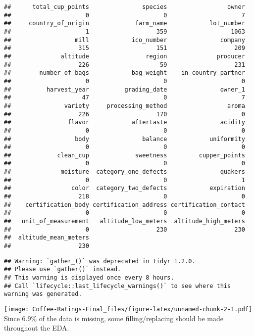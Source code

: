 \documentclass[
]{article}
\begin{document}
\begin{verbatim}
##      total_cup_points               species                 owner 
##                     0                     0                     7 
##     country_of_origin             farm_name            lot_number 
##                     1                   359                  1063 
##                  mill            ico_number               company 
##                   315                   151                   209 
##              altitude                region              producer 
##                   226                    59                   231 
##        number_of_bags            bag_weight    in_country_partner 
##                     0                     0                     0 
##          harvest_year          grading_date               owner_1 
##                    47                     0                     7 
##               variety     processing_method                 aroma 
##                   226                   170                     0 
##                flavor            aftertaste               acidity 
##                     0                     0                     0 
##                  body               balance            uniformity 
##                     0                     0                     0 
##             clean_cup             sweetness         cupper_points 
##                     0                     0                     0 
##              moisture  category_one_defects               quakers 
##                     0                     0                     1 
##                 color  category_two_defects            expiration 
##                   218                     0                     0 
##    certification_body certification_address certification_contact 
##                     0                     0                     0 
##   unit_of_measurement   altitude_low_meters  altitude_high_meters 
##                     0                   230                   230 
##  altitude_mean_meters 
##                   230
\end{verbatim}

\begin{verbatim}
## Warning: `gather_()` was deprecated in tidyr 1.2.0.
## Please use `gather()` instead.
## This warning is displayed once every 8 hours.
## Call `lifecycle::last_lifecycle_warnings()` to see where this warning was generated.
\end{verbatim}

\texttt{[image: Coffee-Ratings-Final\_files/figure-latex/unnamed-chunk-2-1.pdf]}
Since 6.9\% of the data is missing, some filling/replacing should be
made throughout the EDA.
\end{document}
